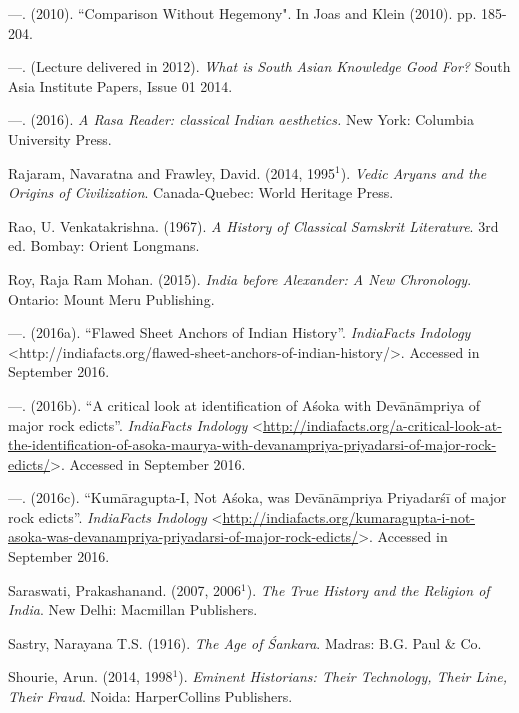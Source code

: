 \begin{thebibliography}{99}
  —. (2010). ``Comparison Without Hegemony". In Joas and Klein (2010). pp. 185-204.

  —. (Lecture delivered in 2012). \textit{What is South Asian Knowledge Good For?} South Asia Institute Papers, Issue 01 2014.

  —. (2016). \textit{A Rasa Reader: classical Indian aesthetics.} New York: Columbia University Press.

  Rajaram, Navaratna and Frawley, David. (2014, 1995$^{1}$). \textit{Vedic Aryans and the Origins of Civilization}. Canada-Quebec: World Heritage Press.

  Rao, U. Venkatakrishna. (1967). \textit{A History of Classical Samskrit Literature}. 3rd ed. Bombay: Orient Longmans.

  Roy, Raja Ram Mohan. (2015). \textit{India before Alexander: A New Chronology}. Ontario: Mount Meru Publishing.

  —. (2016a). “Flawed Sheet Anchors of Indian History”. \textit{IndiaFacts Indology} \textless http://indiafacts.org/flawed-sheet-anchors-of-indian-\break history/\textgreater.  Accessed in September 2016.

  —. (2016b). “A critical look at identification of Aśoka with Devānāmpriya of major rock edicts”. \textit{IndiaFacts Indology} \textless \url{http://indiafacts.org/a-critical-look-at-the-identification-of-asoka-maurya-with-devanampriya-priyadarsi-of-major-rock-edicts/}\textgreater.  Accessed in September 2016.

  —. (2016c). “Kumāragupta-I, Not Aśoka, was Devānāmpriya Priyadarśī of major rock edicts”. \textit{IndiaFacts Indology} \textless \url{http://indiafacts.org/kumaragupta-i-not-asoka-was-devanampriya-priyadarsi-of-major-rock-edicts/}\textgreater.  Accessed in September 2016.

  Saraswati, Prakashanand. (2007, 2006$^{1}$). \textit{The True History and the Religion of India}. New Delhi: Macmillan Publishers.

  Sastry, Narayana T.S. (1916). \textit{The Age of Śankara}. Madras: B.G. Paul \& Co.

  Shourie, Arun. (2014, 1998$^{1}$). \textit{Eminent Historians: Their Technology, Their Line, Their Fraud}. Noida: HarperCollins Publishers.


\end{thebibliography}

